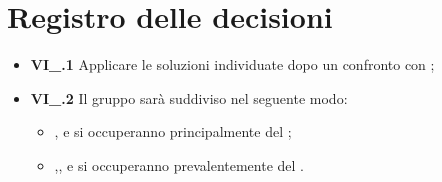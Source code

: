 \section{Registro delle decisioni}
\begin{itemize}
	\item \textbf{VI\_\Data.1} Applicare le soluzioni individuate dopo un confronto con {\Proponente};
	\item \textbf{VI\_\Data.2} Il gruppo sarà suddiviso nel seguente modo:
	\begin{itemize}
		\item {\TL},{\BL} e {\FF} si occuperanno principalmente del ;
		\item {\MM},{\PC},{\TG} e {\VD} si occuperanno prevalentemente del .
	\end{itemize}
\end{itemize}